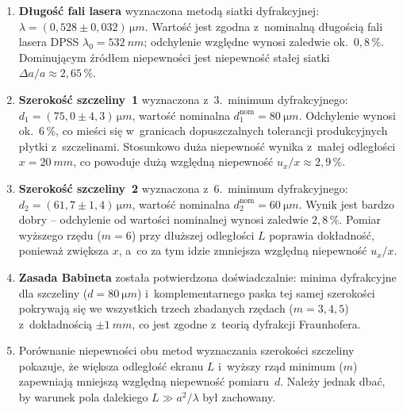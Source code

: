 \documentclass[a4paper,12pt]{article}
\begin{document}
\begin{enumerate}
  \item \textbf{Długość fali lasera} wyznaczona metodą siatki dyfrakcyjnej:
        $\lambda = (0{,}528 \pm 0{,}032)\,\si{\micro m}$.
        Wartość jest zgodna z~nominalną długością fali lasera DPSS
        $\lambda_0 = \SI{532}{nm}$; odchylenie względne wynosi zaledwie
        ok.~$0{,}8\,\%$. Dominującym źródłem niepewności jest niepewność
        stałej siatki~$\Delta a/a \approx 2{,}65\,\%$.

  \item \textbf{Szerokość szczeliny~1} wyznaczona z~3.~minimum dyfrakcyjnego:
        $d_1 = (75{,}0 \pm 4{,}3)\,\si{\micro m}$, wartość nominalna
        $d_1^{\text{nom}} = \SI{80}{\micro m}$.
        Odchylenie wynosi ok.~$6\,\%$, co mieści się w~granicach dopuszczalnych
        tolerancji produkcyjnych płytki z~szczelinami. Stosunkowo duża niepewność
        wynika z~małej odległości $x = \SI{20}{mm}$, co powoduje dużą względną
        niepewność $u_x/x \approx 2{,}9\,\%$.

  \item \textbf{Szerokość szczeliny~2} wyznaczona z~6.~minimum dyfrakcyjnego:
        $d_2 = (61{,}7 \pm 1{,}4)\,\si{\micro m}$, wartość nominalna
        $d_2^{\text{nom}} = \SI{60}{\micro m}$.
        Wynik jest bardzo dobry -- odchylenie od wartości nominalnej wynosi
        zaledwie $2{,}8\,\%$. Pomiar wyższego rzędu ($m = 6$) przy dłuższej
        odległości $L$ poprawia dokładność, ponieważ zwiększa $x$, a~co za tym
        idzie zmniejsza względną niepewność $u_x/x$.

  \item \textbf{Zasada Babineta} została potwierdzona doświadczalnie: minima
        dyfrakcyjne dla szczeliny ($d = \SI{80}{\micro m}$) i~komplementarnego
        paska tej samej szerokości pokrywają się we wszystkich trzech zbadanych
        rzędach ($m = 3, 4, 5$) z~dokładnością $\pm\SI{1}{mm}$, co jest zgodne
        z~teorią dyfrakcji Fraunhofera.

  \item Porównanie niepewności obu metod wyznaczania szerokości szczeliny
        pokazuje, że większa odległość ekranu $L$ i~wyższy rząd minimum
        ($m$) zapewniają mniejszą względną niepewność pomiaru~$d$.
        Należy jednak dbać, by warunek pola dalekiego $L \gg a^2/\lambda$
        był zachowany.
\end{enumerate}
\end{document}
